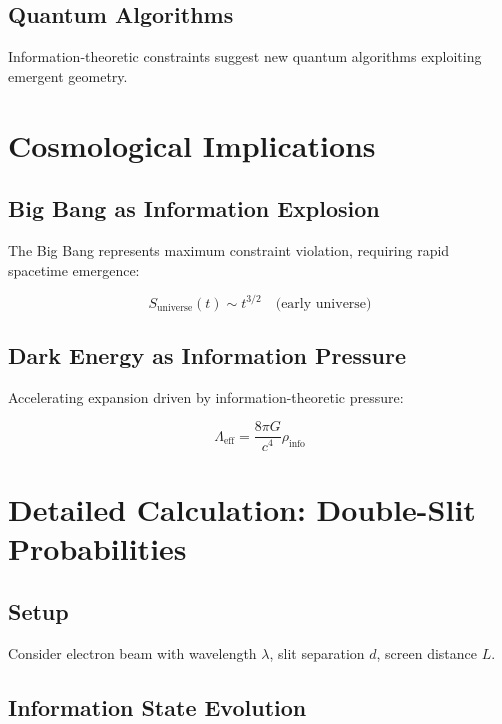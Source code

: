 \documentclass[12pt,a4paper]{article}
\begin{document}
\subsection{Quantum Algorithms}

Information-theoretic constraints suggest new quantum algorithms exploiting emergent geometry.

\section{Cosmological Implications}

\subsection{Big Bang as Information Explosion}

The Big Bang represents maximum constraint violation, requiring rapid spacetime emergence:

\begin{equation}
S_{\text{universe}}(t) \sim t^{3/2} \quad \text{(early universe)}
\end{equation}

\subsection{Dark Energy as Information Pressure}

Accelerating expansion driven by information-theoretic pressure:

\begin{equation}
\Lambda_{\text{eff}} = \frac{8\pi G}{c^4} \rho_{\text{info}}
\end{equation}

\section{Detailed Calculation: Double-Slit Probabilities}

\subsection{Setup}

Consider electron beam with wavelength $\lambda$, slit separation $d$, screen distance $L$.

\subsection{Information State Evolution}
\end{document}
